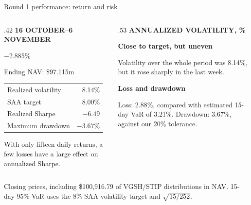\documentclass[aspectratio=169,11pt,t]{beamer}
\newcommand{\source}[1]{\par\vfill{\fontsize{6.3}{8}\selectfont\color{muted}#1\par}}
\newcommand{\labeltext}[1]{{\fontsize{8}{10}\selectfont\color{gold}\textbf{#1}}}
\newcommand{\bigvalue}[1]{{\fontsize{29}{33}\selectfont\color{navy}#1}}
\newcommand{\point}[2]{\textbf{#1}\par\vspace{.04cm}#2\par\vspace{.12cm}}
\newcommand{\smallnote}[1]{{\fontsize{8}{10}\selectfont\color{muted}#1}}
\begin{document}
\begin{frame}{Round 1 performance: return and risk}

\begin{columns}[T,onlytextwidth]
\begin{column}{.42\textwidth}
\labeltext{16 OCTOBER--6 NOVEMBER}\par\vspace{.12cm}
\bigvalue{−2.885\%}\par\small Ending NAV: \$97.115m\par\vspace{.35cm}
\begin{tabular}{@{}lr@{}}\toprule
Realized volatility & 8.14\%\\
SAA target & 8.00\%\\
Realized Sharpe & $-6.49$\\
Maximum drawdown & $-3.67$\%\\\bottomrule
\end{tabular}\par\vspace{.25cm}
\smallnote{With only fifteen daily returns, a few losses have a large effect on annualized Sharpe.}
\end{column}
\begin{column}{.53\textwidth}\small
\labeltext{ANNUALIZED VOLATILITY, \%}\par\vspace{.12cm}
\par\vspace{.12cm}
\point{Close to target, but uneven}{Volatility over the whole period was 8.14\%, but it rose sharply in the last week.}
\point{Loss and drawdown}{Loss: 2.88\%, compared with estimated 15-day VaR of 3.21\%. Drawdown: 3.67\%, against our 20\% tolerance.}
\end{column}\end{columns}
\source{Closing prices, including \$100,916.79 of VGSH/STIP distributions in NAV. 15-day 95\% VaR uses the 8\% SAA volatility target and $\sqrt{15/252}$.}


\end{frame}
\end{document}
